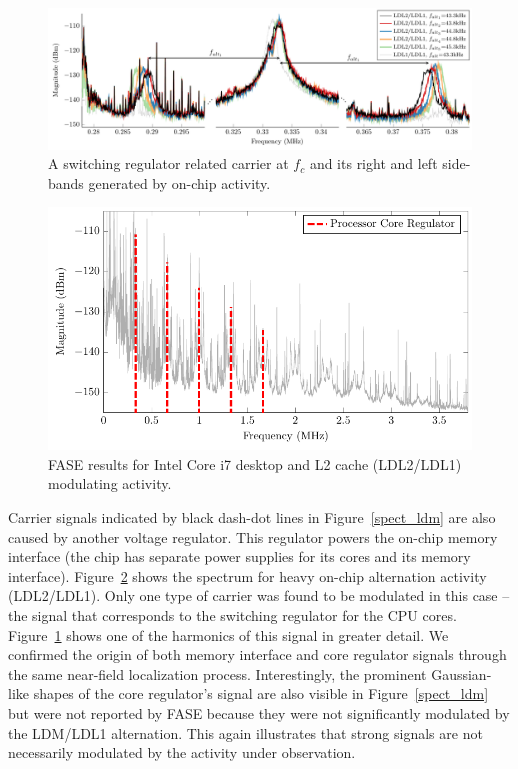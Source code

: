 \begin{figure}[tb]
  \centering
    \includegraphics[width=\textwidth]{../fase/Data/core_reg_zoom.pdf}%
  \caption{A switching regulator related carrier at $f_c$ and its right and left side-bands generated by on-chip activity.}%
  \label{core_reg_zoom}%
\end{figure}

\begin{figure}[thb]
\centering
\includegraphics[trim=0.0in 0in 0in 0in,clip,width=5in]{../fase/Data/spect_ldl2.pdf}
\caption{FASE results for Intel Core i7 desktop and L2 cache (LDL2/LDL1) modulating activity.}
\label{spect_ldl2}
\end{figure}

Carrier signals indicated by black dash-dot lines in Figure~\ref{spect_ldm} are also caused by another voltage regulator. This regulator powers the on-chip memory interface (the chip has separate power supplies for its cores and its memory interface). Figure~\ref{spect_ldl2} shows the spectrum for heavy on-chip alternation activity (LDL2/LDL1). Only one type of carrier was found to be modulated in this case -- the signal that corresponds to the switching regulator for the CPU cores. Figure~\ref{core_reg_zoom} shows one of the harmonics of this signal in greater detail. We confirmed the origin of both memory interface and core regulator signals through the same near-field localization process. Interestingly, the prominent Gaussian-like shapes of the core regulator's signal are also visible in Figure~\ref{spect_ldm} but were not reported by FASE because they were not significantly modulated by the LDM/LDL1 alternation. This again illustrates that strong signals are not necessarily modulated by the activity under observation.

